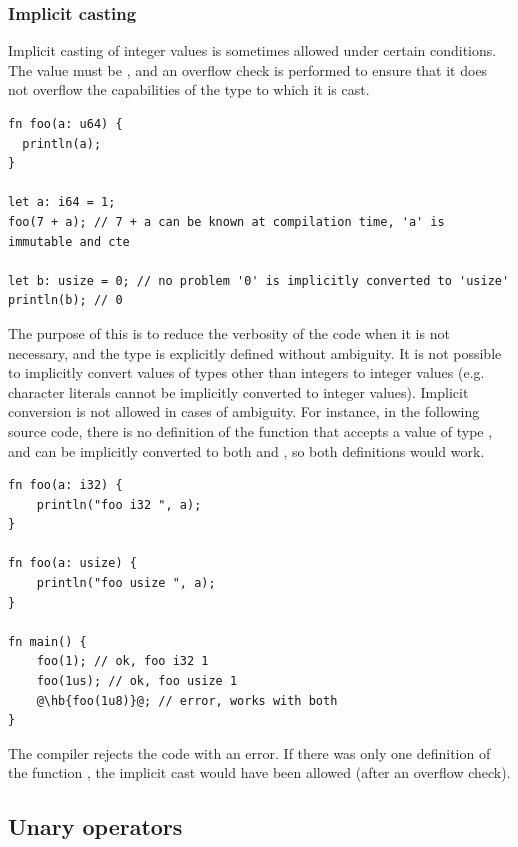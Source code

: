 \subsubsection{Implicit casting}

Implicit casting of integer values is sometimes allowed under certain
conditions. The value must be , and an overflow check is performed
to ensure that it does not overflow the capabilities of the type to which it is
cast.

  \begin{lstlisting}[style=coloredverbatim]
fn foo(a: u64) {
  println(a);
}

let a: i64 = 1;
foo(7 + a); // 7 + a can be known at compilation time, 'a' is immutable and cte

let b: usize = 0; // no problem '0' is implicitly converted to 'usize'
println(b); // 0
  \end{lstlisting}

The purpose of this is to reduce the verbosity of the code when it is not
necessary, and the type is explicitly defined without ambiguity. It is not
possible to implicitly convert values of types other than integers to integer
values (e.g. character literals cannot be implicitly converted to integer
values). Implicit conversion is not allowed in cases of ambiguity. For instance,
in the following source code, there is no definition of the function
 that accepts a value of type , and  can be
implicitly converted to both  and , so both definitions
would work.

\begin{lstlisting}[style=coloredverbatimError, escapechar=@]
fn foo(a: i32) {
    println("foo i32 ", a);
}

fn foo(a: usize) {
    println("foo usize ", a);
}

fn main() {
    foo(1); // ok, foo i32 1
    foo(1us); // ok, foo usize 1
    @\hb{foo(1u8)}@; // error, works with both
}
  \end{lstlisting}

The compiler rejects the code with an error. If there was only one definition of
the function , the implicit cast would have been allowed (after an
overflow check).

\subsection{Unary operators}
\label{sec:orge691bb5}

